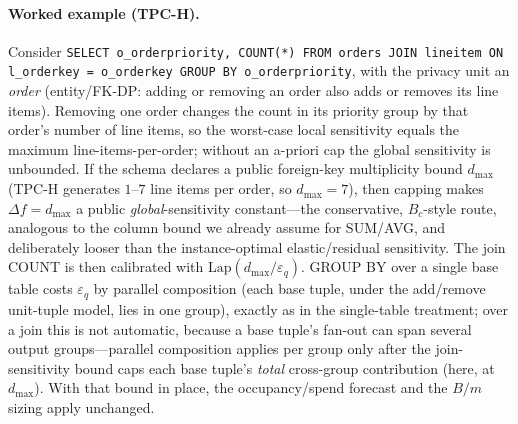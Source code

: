 \documentclass[sigconf,nonacm]{acmart}
\newcommand{\eps}{\varepsilon}
\newcommand{\Lap}{\mathrm{Lap}}
\begin{document}
\paragraph{Worked example (TPC-H).}
Consider \texttt{SELECT o\_orderpriority, COUNT(*) FROM orders JOIN lineitem ON l\_orderkey = o\_orderkey GROUP BY o\_orderpriority}, with the privacy unit an \emph{order} (entity/FK-DP: adding or removing an order also adds or removes its line items). Removing one order changes the count in its priority group by that order's number of line items, so the worst-case local sensitivity equals the maximum line-items-per-order; without an a-priori cap the global sensitivity is unbounded. If the schema declares a public foreign-key multiplicity bound $d_{\max}$ (TPC-H generates $1$--$7$ line items per order, so $d_{\max}=7$), then capping makes $\Delta f=d_{\max}$ a public \emph{global}-sensitivity constant---the conservative, $B_c$-style route, analogous to the column bound we already assume for SUM/AVG, and deliberately looser than the instance-optimal elastic/residual sensitivity. The join COUNT is then calibrated with $\Lap(d_{\max}/\eps_q)$. GROUP BY over a single base table costs $\eps_q$ by parallel composition (each base tuple, under the add/remove unit-tuple model, lies in one group), exactly as in the single-table treatment; over a join this is not automatic, because a base tuple's fan-out can span several output groups---parallel composition applies per group only after the join-sensitivity bound caps each base tuple's \emph{total} cross-group contribution (here, at $d_{\max}$). With that bound in place, the occupancy/spend forecast and the $B/m$ sizing apply unchanged.
\end{document}
